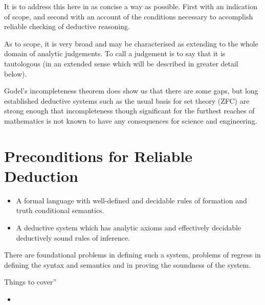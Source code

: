 {It is to address this here in as concise a way as possible.
First with an indication of scope, and second with an account of the conditions necessary to accomplish reliable checking of deductive reasoning.

As to scope, it is very broad and may be characterised as extending to the whole domain of analytic judgements.
To call a judgement  is to say that it is tautologous (in an extended sense which will be described in greater detail below).

Godel's incompleteness theorem does show us that there are some gaps, but long established deductive systems such as the usual basis for set theory (ZFC) are strong enough that incompleteness though significant for the furthest reaches of mathematics is not known to have any consequences for science and engineering.

\section{Preconditions for Reliable Deduction}

\begin{itemize}
\item A formal language with well-defined and decidable rules of formation and truth conditional semantics.
\item A deductive system which has analytic axioms and  effectively decidable deductively sound rules of inference.
\end{itemize}

There are foundational problems in defining such a system, problems of regress in defining the syntax and semantics and in proving the soundness of the system.


Things to cover''

\begin{itemize}
\item
\end{itemize}

}%
